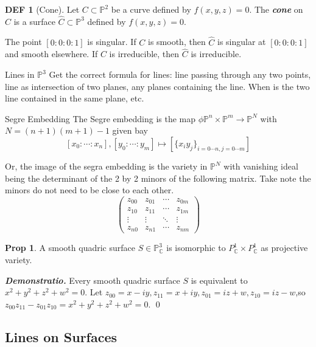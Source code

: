 \documentclass[twocolumn]{article}
\renewenvironment{proof}{\vspace{0.4cm}\noindent\small{\emph{Demonstratio.}}}{\qed\vspace{0.4cm}}
\renewcommand{\emph}[1]{\textbf{\textit{#1}}}
\newcommand{\C}{\mathbb{C}}
\renewcommand{\P}{\mathbb{P}}
\theoremstyle{definition}
\newtheorem{prop}[thm]{Prop}
\newtheorem{defi}[thm]{DEF}
\theoremstyle{remark}
\begin{document}
\begin{defi}[Cone]
	Let $C \subset \P^2$ be a curve defined by $f(x, y,z) = 0$. The \emph{cone} on $C$ is a surface $\hat{C} \subset \P^3$ defined by $f(x,y,z) = 0$.

	The point $[0:0:0:1]$ is singular.
	If $C$ is smooth, then $\hat{C}$ is singular at $[0:0:0:1]$ and smooth elsewhere.
	If $C$ is irreducible, then $\hat{C}$ is irreducible.
\end{defi}

\begin{toverify}{Lines in $\P^3$}{}
	Get the correct formula for lines: line passing through any two points, line as intersection of two planes, any planes containing the line.
	When is the two line contained in the same plane, etc.
\end{toverify}

\begin{fthm}{Segre Embedding}{}
	The Segre embedding is the map $\phi \P^n \times \P^m \rightarrow \P^N$ with $N = (n+1)(m+1) - 1$ given bay 
	$$
	[x_0: \cdots : x_n] , [y_0: \cdots: y_m] \mapsto [\{x_iy_j\}_{i=0 \cdots n, j=0 \cdots m}]
	$$

	Or, the image of the segra embedding is the variety in $\P^{N}$ with vanishing ideal being the determinant of the 2 by 2 minors of the following matrix. 
	Take note the minors do not need to be close to each other.
	$$ 
	\begin{pmatrix}
		z_{00} & z_{01} & \cdots & z_{0m} \\ 
		z_{10} & z_{11} & \cdots & z_{1m} \\ 
		\vdots & \vdots & \ddots & \vdots \\ 
		z_{n0} & z_{n1} & \cdots & z_{nm} 
	\end{pmatrix}
	$$
\end{fthm}

\begin{prop}
	A smooth quadric surface $S \in \P^3_{\C}$ is isomorphic to $P^1_{\C} \times P^1_{\C}$ as projective variety.
\end{prop}
\begin{proof}
	Every smooth quadric surface $S$ is equivalent to $x^2 + y^2 + z^2 + w^2 = 0$. Let $z_{00} = x-iy, z_{11} = x+iy, z_{01} = iz + w, z_{10} = iz -w$,so $z_{00} z_{11} - z_{01} z_{10} = x^2 + y^2 + z^2 + w^2 = 0$.
\end{proof}

\subsection{Lines on Surfaces}
\end{document}
